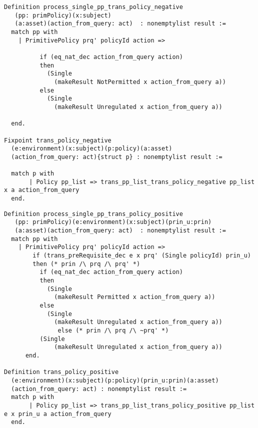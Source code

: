 \begin{lstlisting}
Definition process_single_pp_trans_policy_negative
   (pp: primPolicy)(x:subject)
   (a:asset)(action_from_query: act)  : nonemptylist result :=
  match pp with
    | PrimitivePolicy prq' policyId action =>
 
          if (eq_nat_dec action_from_query action)
          then
            (Single 
              (makeResult NotPermitted x action_from_query a))
          else
            (Single 
              (makeResult Unregulated x action_from_query a))

  end.

Fixpoint trans_policy_negative
  (e:environment)(x:subject)(p:policy)(a:asset)
  (action_from_query: act){struct p} : nonemptylist result :=
  
  match p with  
       | Policy pp_list => trans_pp_list_trans_policy_negative pp_list x a action_from_query
  end.
\end{lstlisting}

\begin{lstlisting}
Definition process_single_pp_trans_policy_positive 
   (pp: primPolicy)(e:environment)(x:subject)(prin_u:prin)
   (a:asset)(action_from_query: act)  : nonemptylist result :=
  match pp with
    | PrimitivePolicy prq' policyId action =>
        if (trans_preRequisite_dec e x prq' (Single policyId) prin_u)
        then (* prin /\ prq /\ prq' *)
          if (eq_nat_dec action_from_query action)
          then
            (Single 
              (makeResult Permitted x action_from_query a))
          else
            (Single 
              (makeResult Unregulated x action_from_query a))
               else (* prin /\ prq /\ ~prq' *)
          (Single 
              (makeResult Unregulated x action_from_query a))
      end.

Definition trans_policy_positive
  (e:environment)(x:subject)(p:policy)(prin_u:prin)(a:asset)
  (action_from_query: act) : nonemptylist result :=
  match p with
       | Policy pp_list => trans_pp_list_trans_policy_positive pp_list e x prin_u a action_from_query
  end.

\end{lstlisting}

